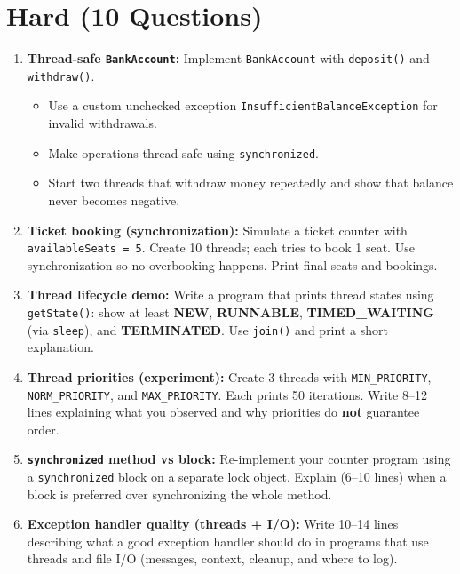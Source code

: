\documentclass[11pt,a4paper]{article}
\begin{document}
\section*{Hard (10 Questions)}
\begin{enumerate}[label=H\arabic*., leftmargin=*]
  \item \textbf{Thread-safe \texttt{BankAccount}:} Implement \texttt{BankAccount} with \texttt{deposit()} and \texttt{withdraw()}.
    \begin{itemize}[leftmargin=*]
      \item Use a custom unchecked exception \texttt{InsufficientBalanceException} for invalid withdrawals.
      \item Make operations thread-safe using \texttt{synchronized}.
      \item Start two threads that withdraw money repeatedly and show that balance never becomes negative.
    \end{itemize}

  \item \textbf{Ticket booking (synchronization):} Simulate a ticket counter with \texttt{availableSeats = 5}.
    Create 10 threads; each tries to book 1 seat. Use synchronization so no overbooking happens.
    Print final seats and bookings.

  \item \textbf{Thread lifecycle demo:} Write a program that prints thread states using \texttt{getState()}:
    show at least \textbf{NEW}, \textbf{RUNNABLE}, \textbf{TIMED\_WAITING} (via \texttt{sleep}), and \textbf{TERMINATED}.
    Use \texttt{join()} and print a short explanation.

  \item \textbf{Thread priorities (experiment):} Create 3 threads with \texttt{MIN\_PRIORITY}, \texttt{NORM\_PRIORITY},
    and \texttt{MAX\_PRIORITY}. Each prints 50 iterations.
    Write 8--12 lines explaining what you observed and why priorities do \textbf{not} guarantee order.

  \item \textbf{\texttt{synchronized} method vs block:} Re-implement your counter program using a \texttt{synchronized} block
    on a separate lock object. Explain (6--10 lines) when a block is preferred over synchronizing the whole method.

  \item \textbf{Exception handler quality (threads + I/O):} Write 10--14 lines describing what a good exception handler should do
    in programs that use threads and file I/O (messages, context, cleanup, and where to log).


\end{enumerate}
\end{document}
